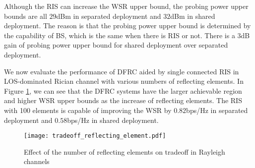 Although the RIS can increase the WSR upper bound, the 
probing power upper bounds are all $29$dBm in separated deployment and $32$dBm in shared deployment. 
The reason is that the probing power upper bound is determined by the capability of BS, which is the same when there is RIS or not.
There is a $3$dB gain of probing power upper bound for shared deployment over separated deployment.

We now evaluate the performance of DFRC aided by single connected RIS in LOS-dominated Rician channel with various numbers of reflecting elements. In Figure \ref{fig:tradeoff_reflecting_element}, we can see 
that the DFRC systems have the larger achievable region and higher WSR upper bounds as the increase of reflecting elements. The RIS 
with 100 elements is capable of improving the WSR by $0.82$bps/Hz in separated deployment and $0.58$bps/Hz in shared deployment. 
\begin{figure}[h]
    \centering
    \texttt{[image: tradeoff\_reflecting\_element.pdf]}
    \caption{Effect of the number of reflecting elements on tradeoff in Rayleigh channels}
    \label{fig:tradeoff_reflecting_element}
\end{figure}